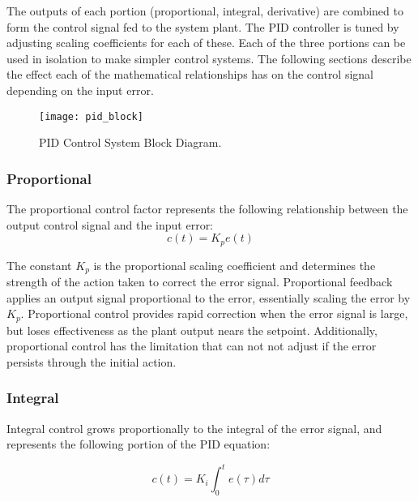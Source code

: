 \documentclass[openany,11pt,fleqn]{book} %
\begin{document}
The outputs of each portion (proportional, integral, derivative) are combined to form the control signal fed to the system plant. The PID controller is tuned by adjusting scaling coefficients for each of these. Each of the three portions can be used in isolation to make simpler control systems. The following sections describe the effect each of the mathematical relationships has on the control signal depending on the input error. 


\begin{figure}[tb]
    \centering\texttt{[image: pid\_block]}
    \caption{PID Control System Block Diagram.}
    \label{pid_block}
\end{figure}

\subsubsection{\color{orange}Proportional}
The proportional control factor represents the following relationship between the output control signal and the input error:
\begin{equation*}
 c(t) = K_{p}e(t) 
\end{equation*} 

The constant $K_{p}$ is the proportional scaling coefficient and determines the strength of the action taken to correct the error signal. Proportional feedback applies an output signal proportional to the error, essentially scaling the error by $K_{p}$.
Proportional control provides rapid correction when the error signal is large, but loses effectiveness as the plant output nears the setpoint. Additionally, proportional control has the limitation that can not not adjust if the error persists through the initial action. 

\subsubsection{\color{orange}Integral}
Integral control grows proportionally to the integral of the error signal, and represents the following portion of the PID equation:

\begin{equation*}
c(t) = K_{i}\int_{0}^{t}e(\tau)d\tau
\end{equation*} 
\end{document}
